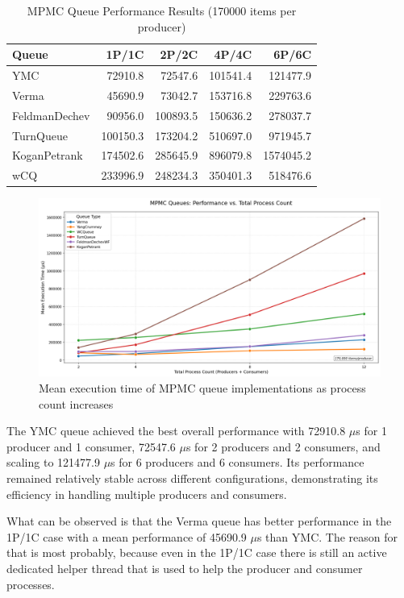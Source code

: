\begin{table}[htb]
\centering
\caption{\ac{MPMC} Queue Performance Results (170000 items per producer)}
\label{tab:mpmc-results}
\begin{tabular}{@{}lrrrr@{}}
\toprule
Queue & 1P/1C & 2P/2C & 4P/4C & 6P/6C \\
\midrule
\ac{YMC} & 72910.8 & 72547.6 & 101541.4 & 121477.9 \\
Verma & 45690.9 & 73042.7 & 153716.8 & 229763.6 \\
FeldmanDechev & 90956.0 & 100893.5 & 150636.2 & 278037.7 \\
TurnQueue & 100150.3 & 173204.2 & 510697.0 & 971945.7 \\
KoganPetrank & 174502.6 & 285645.9 & 896079.8 & 1574045.2 \\
\ac{wCQ} & 233996.9 & 248234.3 & 350401.3 & 518476.6 \\
\bottomrule
\end{tabular}
\end{table}

\begin{figure}[htb]
\centering
\caption{Mean execution time of MPMC queue implementations as process count increases}
\label{fig:mpmc-mean-performance}
\includegraphics[width=\textwidth]{images/results/mpmc_mean_performance_vs_processes.png}
\end{figure}

The \ac{YMC} queue achieved the best overall performance with 72910.8 $\mu$s for 1 producer and 1 consumer, 72547.6 $\mu$s for 2 producers and 2 consumers, and scaling to 121477.9 $\mu$s for 6 producers and 6 consumers. Its performance remained relatively stable across different configurations, demonstrating its efficiency in handling multiple producers and consumers.

What can be observed is that the Verma queue has better performance in the 1P/1C case with a mean performance of 45690.9 $\mu$s than \ac{YMC}. The reason for that is most probably, because even in the 1P/1C case there is still an active dedicated helper thread that is used to help the producer and consumer processes.

